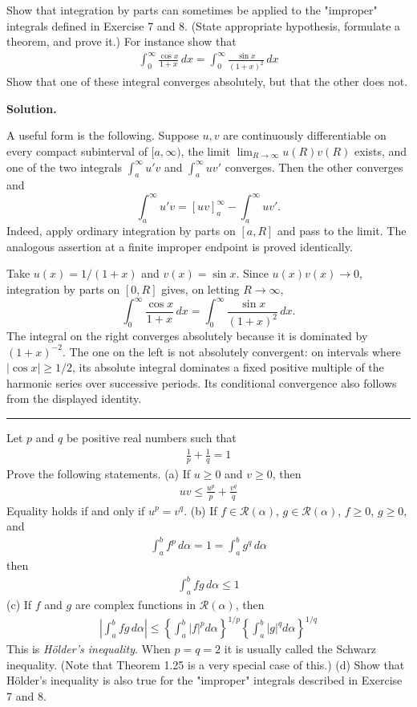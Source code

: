 \documentclass[12pt]{article}
\theoremstyle{definition}
\begin{document}
Show that integration by parts can sometimes be applied to the "improper" integrals defined in Exercise 7 and 8. (State appropriate hypothesis, formulate a theorem, and prove it.) For instance show that
\begin{align*}
\int_0^\infty\frac{\cos x}{1+x}\,dx=\int_0^\infty\frac{\sin x}{(1+x)^2}\,dx
\end{align*}
Show that one of these integral converges absolutely, but that the other does not.

\smallskip
\noindent\textbf{Solution.}\quad


A useful form is the following.  Suppose $u,v$ are continuously differentiable on every compact subinterval of $[a,\infty)$, the limit $\lim_{R\to\infty}u(R)v(R)$ exists, and one of the two integrals $\int_a^\infty u'v$ and $\int_a^\infty uv'$ converges.  Then the other converges and
\[
 \int_a^\infty u'v=[uv]_a^\infty-\int_a^\infty uv'.
\]
Indeed, apply ordinary integration by parts on $[a,R]$ and pass to the limit.  The analogous assertion at a finite improper endpoint is proved identically.

Take $u(x)=1/(1+x)$ and $v(x)=\sin x$.  Since $u(x)v(x)\to0$, integration by parts on $[0,R]$ gives, on letting $R\to\infty$,
\[
 \int_0^\infty\frac{\cos x}{1+x}\,dx
 =\int_0^\infty\frac{\sin x}{(1+x)^2}\,dx.
\]
The integral on the right converges absolutely because it is dominated by $(1+x)^{-2}$.  The one on the left is not absolutely convergent: on intervals where $|\cos x|\ge1/2$, its absolute integral dominates a fixed positive multiple of the harmonic series over successive periods.  Its conditional convergence also follows from the displayed identity.




\bigskip\noindent\hrule\bigskip

Let $p$ and $q$ be positive real numbers such that
\begin{align*}
\frac{1}{p}+\frac{1}{q}=1
\end{align*}
Prove the following statements.
(a) If $u\ge 0$ and $v\ge 0$, then
\begin{align*}
uv\le\frac{u^p}{p}+\frac{v^q}{q}
\end{align*}
Equality holds if and only if $u^p=v^q$.
(b) If $f\in\mathcal{R}(\alpha)$, $g\in\mathcal{R}(\alpha)$, $f\ge 0$, $g\ge 0$, and
\begin{align*}
\int_a^bf^p\,d\alpha=1=\int_a^bg^q\,d\alpha
\end{align*}
then
\begin{align*}
\int_a^bfg\,d\alpha\le 1
\end{align*}
(c) If $f$ and $g$ are complex functions in $\mathcal{R}(\alpha)$, then
\begin{align*}
\left\vert\int_a^bfg\,d\alpha\right\vert
\le\left\{\int_a^b\left\vert f\right\vert^pd\alpha\right\}^{1/p}
\left\{\int_a^b\left\vert g\right\vert^qd\alpha\right\}^{1/q}
\end{align*}
This is \textit{Hölder's inequality}. When $p=q=2$ it is usually called the Schwarz inequality. (Note that Theorem 1.25 is a very special case of this.)
(d) Show that Hölder's inequality is also true for the "improper" integrals described in Exercise 7 and 8.
\end{document}
